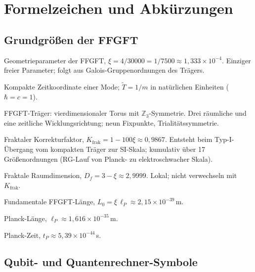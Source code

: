 \chapter*{Formelzeichen und Abkürzungen}

\section*{Grundgrößen der FFGFT}

\begin{description}[leftmargin=4.5em,style=sameline,itemsep=0.4em]
  \item[$\xi$] Geometrieparameter der FFGFT, $\xi = 4/30000 =
    1/7500 \approx 1{,}333\times10^{-4}$. Einziger freier Parameter;
    folgt aus Galois-Gruppenordnungen des Trägers.
  \item[$\tilde T$] Kompakte Zeitkoordinate einer Mode; $\tilde T =
    1/m$ in natürlichen Einheiten ($\hbar = c = 1$).
  \item[$T^4/\mathbb{Z}_3$] FFGFT-Träger: vierdimensionaler Torus mit
    $\mathbb{Z}_3$-Symmetrie. Drei räumliche und eine zeitliche
    Wicklungsrichtung; neun Fixpunkte, Trialitätssymmetrie.
  \item[$K_{\mathrm{frak}}$] Fraktaler Korrekturfaktor,
    $K_{\mathrm{frak}} = 1 - 100\xi \approx 0{,}9867$. Entsteht beim
    Typ-I-Übergang vom kompakten Träger zur SI-Skala; kumulativ über
    17 Größenordnungen (RG-Lauf von Planck- zu elektroschwacher Skala).
  \item[$D_f$] Fraktale Raumdimension, $D_f = 3 - \xi \approx
    2{,}9999$. Lokal; nicht verwechseln mit $K_{\mathrm{frak}}$.
  \item[$L_0$] Fundamentale FFGFT-Länge, $L_0 = \xi\,\ell_P \approx
    2{,}15\times10^{-39}$\,m.
  \item[$\ell_P$] Planck-Länge, $\ell_P \approx 1{,}616\times10^{-35}$\,m.
  \item[$t_P$] Planck-Zeit, $t_P \approx 5{,}39\times10^{-44}$\,s.
\end{description}

\section*{Qubit- und Quantenrechner-Symbole}

